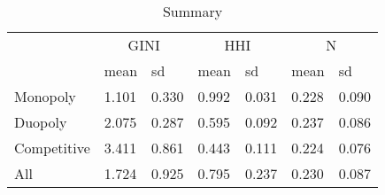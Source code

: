 \begin{table}
\caption{Summary}
\centering
\begin{tabular}[t]{lllllll}\toprule
\multicolumn{1}{c}{ } & \multicolumn{2}{c}{GINI} & \multicolumn{2}{c}{HHI} & \multicolumn{2}{c}{N} \\\cmidrule(l{3pt}r{3pt}){2-3}  \cmidrule(l{3pt}r{3pt}){4-5} \cmidrule(l{3pt}r{3pt}){6-7}  & mean & sd & mean  & sd  & mean   & sd  \\
  \midrule
Monopoly & 1.101 & 0.330 & 0.992 & 0.031 & 0.228 & 0.090\\
  Duopoly & 2.075 & 0.287 & 0.595 & 0.092 & 0.237 & 0.086\\
  Competitive & 3.411 & 0.861 & 0.443 & 0.111 & 0.224 & 0.076\\
  All & 1.724 & 0.925 & 0.795 & 0.237 & 0.230 & 0.087\\
  \bottomrule
	\end{tabular}
\end{table}
